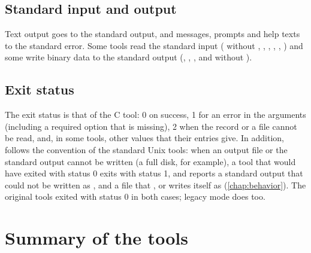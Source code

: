 \subsection{Standard input and output}
\label{sec:tools-stdio}

Text output goes to the standard output, and messages, prompts and help texts to the
standard error. Some tools read the standard input ( without ,
, , , , ) and some write
binary data to the standard output (, , , and
 without ).

\subsection{Exit status}
\label{sec:tools-status}

The exit status is that of the C tool: 0 on success, 1 for an error in the arguments
(including a required option that is missing), 2 when the record or a file cannot be read,
and, in some tools, other values that their entries give. In addition, \wfdbx{} follows the
convention of the standard Unix tools: when an output file or the standard output cannot be
written (a full disk, for example), a tool that would have exited with status 0 exits with
status 1, and reports a standard output that could not be written as
, and a file that , 
or  writes itself as 
(\cref{chap:behavior}). The original tools exited with status 0 in both cases; legacy
mode does too.

\section{Summary of the tools}
\label{sec:tools-summary}


